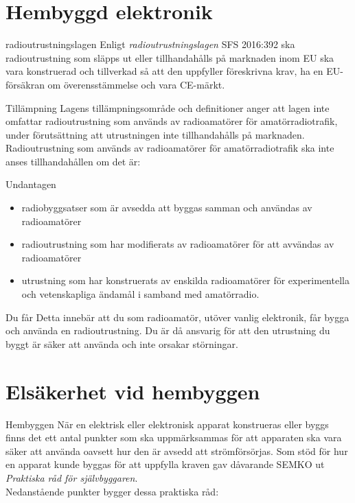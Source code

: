 \documentclass{beamer}
\begin{document}
\section{Hembyggd elektronik}

\begin{frame}{radioutrustningslagen}
Enligt \emph{radioutrustningslagen} SFS 2016:392 ska radioutrustning som släpps
ut eller tillhandahålls på marknaden inom EU ska vara konstruerad och tillverkad
så att den uppfyller föreskrivna krav, ha en EU-försäkran om överensstämmelse
och vara CE-märkt.
\end{frame}

\begin{frame}{Tillämpning}
Lagens tillämpningsområde och definitioner anger att lagen inte omfattar
radioutrustning som används av radioamatörer för amatörradiotrafik, under
förutsättning att utrustningen inte tillhandahålls på marknaden.
Radioutrustning som används av radioamatörer för amatörradiotrafik ska inte
anses tillhandahållen om det är:
\end{frame}

\begin{frame}{Undantagen}
\begin{itemize}
	\item radiobyggsatser som är avsedda att byggas samman och användas av
	radioamatörer
	\item radioutrustning som har modifierats av radioamatörer för att
	avvändas av radioamatörer
	\item utrustning som har konstruerats av enskilda radioamatörer för
	experimentella och vetenskapliga ändamål i samband med amatörradio.
\end{itemize}
\end{frame}

\begin{frame}{Du får}
Detta innebär att du som radioamatör, utöver vanlig elektronik, får bygga
och använda en radioutrustning.
Du är då ansvarig för att den utrustning du byggt är säker att använda och inte
orsakar störningar.
\end{frame}

\section{Elsäkerhet vid hembyggen}
\begin{frame}{Hembyggen}
När en elektrisk eller elektronisk apparat konstrueras eller byggs finns det
ett antal punkter som ska uppmärksammas för att apparaten ska vara säker att
använda oavsett hur den är avsedd att strömförsörjas.
Som stöd för hur en apparat kunde byggas för att uppfylla kraven gav
dåvarande SEMKO ut \emph{Praktiska råd för självbyggaren}.\\
\vspace{5mm}
Nedanstående punkter bygger dessa praktiska råd:
\end{frame}
\end{document}
